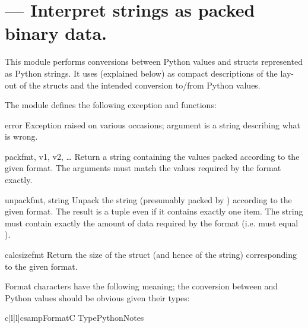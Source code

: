 \section{ ---
         Interpret strings as packed binary data.}



This module performs conversions between Python values and \C{}
structs represented as Python strings.  It uses 
(explained below) as compact descriptions of the lay-out of the \C{}
structs and the intended conversion to/from Python values.

The module defines the following exception and functions:


\begin{excdesc}{error}
  Exception raised on various occasions; argument is a string
  describing what is wrong.
\end{excdesc}

\begin{funcdesc}{pack}{fmt, v1, v2, \textrm{\ldots}}
  Return a string containing the values
   packed according to the given
  format.  The arguments must match the values required by the format
  exactly.
\end{funcdesc}

\begin{funcdesc}{unpack}{fmt, string}
  Unpack the string (presumably packed by ) according to the given format.  The result is a
  tuple even if it contains exactly one item.  The string must contain
  exactly the amount of data required by the format (i.e.
   must equal ).
\end{funcdesc}

\begin{funcdesc}{calcsize}{fmt}
  Return the size of the struct (and hence of the string)
  corresponding to the given format.
\end{funcdesc}

Format characters have the following meaning; the conversion between
\C{} and Python values should be obvious given their types:

\begin{tableiv}{c|l|l|c}{samp}{Format}{C Type}{Python}{Notes}
\end{tableiv}

